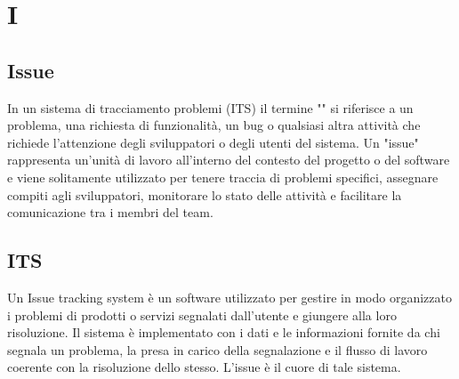 \chapter{I}

\section{Issue}\label{sec:Issues}
In un sistema di tracciamento problemi (ITS) il termine "" si riferisce a un problema, una richiesta di funzionalità, un bug o qualsiasi altra attività che richiede l'attenzione degli sviluppatori o degli utenti del sistema. Un "issue" rappresenta un'unità di lavoro all'interno del contesto del progetto o del software e viene solitamente utilizzato per tenere traccia di problemi specifici, assegnare compiti agli sviluppatori, monitorare lo stato delle attività e facilitare la comunicazione tra i membri del team.

\section{ITS}\label{sec:Issue Tracking System}
Un Issue tracking system è un software utilizzato per gestire in modo organizzato i problemi di prodotti o servizi segnalati dall’utente e giungere alla loro risoluzione. Il sistema è implementato con i dati e le informazioni fornite da chi segnala un problema, la presa in carico della segnalazione e il flusso di lavoro coerente con la risoluzione dello stesso. L'issue è il cuore di tale sistema.
